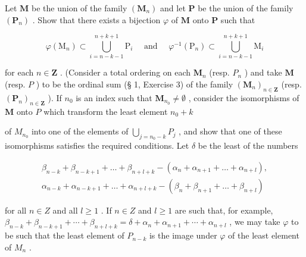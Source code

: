 Let \(\mathbf{M}\) be the union of the family \((\mathbf{M}_n)\) and let \(\mathbf{P}\) be the union of the family \((\mathbf{P}_n)\) . Show that there exists a bijection \(\varphi\) of \(\mathbf{M}\) onto \(\mathbf{P}\) such that

\[
\varphi \left(\mathrm{M} _ {n}\right) \subset \bigcup_ {i = n - k - 1} ^ {n + k + 1} \mathrm{P} _ {i} \quad \text { and } \quad \varphi^ {- 1} \left(\mathrm{P} _ {n}\right) \subset \bigcup_ {i = n - k - 1} ^ {n + k + 1} \mathrm{M} _ {i}
\]

for each \(n \in \mathbf{Z}\) . (Consider a total ordering on each \(\mathbf{M}_n\) (resp. \(P_n\) ) and take \(\mathbf{M}\) (resp. \(P\) ) to be the ordinal sum (§ 1, Exercise 3) of the family \((\mathbf{M}_n)_{n \in \mathbf{Z}}\) (resp. \((\mathbf{P}_n)_{n \in \mathbf{Z}}\) ). If \(n_0\) is an index such that \(\mathbf{M}_{n_0} \neq \emptyset\) , consider the isomorphisms of \(\mathbf{M}\) onto \(P\) which transform the least element \(n_0 + k\)

of \(M_{n_{0}}\) into one of the elements of \(\bigcup_{j=n_{0}-k} P_{j}\) , and show that one of these isomorphisms satisfies the required conditions. Let \(\delta\) be the least of the numbers

\[
\begin{array}{l} \beta_ {n - k} + \beta_ {n - k + 1} + \dots + \beta_ {n + l + k} - (\alpha_ {n} + \alpha_ {n + 1} + \dots + \alpha_ {n + l}), \\ \alpha_ {n - k} + \alpha_ {n - k + 1} + \dots + \alpha_ {n + l + k} - (\beta_ {n} + \beta_ {n + 1} + \dots + \beta_ {n + l}) \end{array}
\]

for all \(n \in Z\) and all \(l \geqslant 1\) . If \(n \in Z\) and \(l \geqslant 1\) are such that, for example, \(\beta_{n-k} + \beta_{n-k+1} + \cdots + \beta_{n+l+k} = \delta + \alpha_n + \alpha_{n+1} + \cdots + \alpha_{n+l}\) , we may take \(\varphi\) to be such that the least element of \(P_{n-k}\) is the image under \(\varphi\) of the least element of \(M_n\) .

